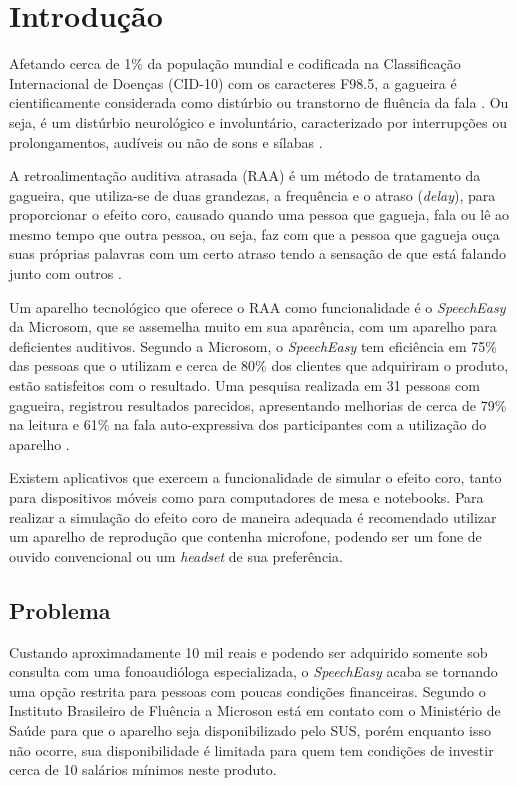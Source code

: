 \chapter{Introdu\c{c}\~ao}

Afetando cerca de 1\% da popula\c{c}\~ao mundial e codificada na Classifica\c{c}\~ao Internacional de Doen\c{c}as (CID-10) com os caracteres F98.5, a gagueira \'e cientificamente considerada como dist\'urbio ou transtorno de flu\^encia da fala \cite{Merlo2013}. Ou seja, \'e um dist\'urbio neurol\'ogico e involunt\'ario, caracterizado por interrup\c{c}\~oes ou prolongamentos, aud\'iveis ou n\~ao de sons e s\'ilabas \cite{Buechel2004}.

A retroalimenta\c{c}\~ao auditiva atrasada (RAA) \'e um m\'etodo de tratamento da gagueira, que utiliza-se de duas grandezas, a frequ\^encia e o atraso (\textit{delay}), para proporcionar o efeito coro, causado quando uma pessoa que gagueja, fala ou l\^e ao mesmo tempo que outra pessoa, ou seja, faz com que  a pessoa que gagueja ou\c{c}a suas pr\'oprias palavras com um certo atraso tendo a sensa\c{c}\~ao de que est\'a falando junto com outros \cite{Udemo2008}.

Um aparelho tecnol\'ogico que oferece o RAA como funcionalidade \'e o \textit{SpeechEasy} da Microsom, que se assemelha muito em sua apar\^encia, com um aparelho para deficientes auditivos. Segundo a Microsom, o \textit{SpeechEasy} tem efici\^encia em 75\% das pessoas que o utilizam e cerca de 80\% dos clientes que adquiriram o produto, est\~ao satisfeitos com o resultado. Uma pesquisa realizada em 31 pessoas com gagueira, registrou resultados parecidos, apresentando melhorias de cerca de 79\% na leitura e 61\% na fala auto-expressiva dos participantes com a utiliza\c{c}\~ao do aparelho \cite{Andrade2008}. 

Existem aplicativos que exercem a funcionalidade de simular o efeito coro, tanto para dispositivos m\'oveis como para computadores de mesa e notebooks. Para realizar a simula\c{c}\~ao do efeito coro de maneira adequada \'e recomendado utilizar um aparelho de reprodu\c{c}\~ao que contenha microfone, podendo ser um fone de ouvido convencional ou um \textit{headset} de sua prefer\^encia.

 
\section{Problema}

Custando aproximadamente 10 mil reais e podendo ser adquirido somente sob consulta com uma fonoaudi\'ologa especializada, o \textit{SpeechEasy} acaba se tornando uma op\c{c}\~ao restrita para pessoas com poucas condi\c{c}\~oes financeiras. Segundo o Instituto Brasileiro de Flu\^encia a Microson est\'a em contato com o Minist\'erio de Sa\'ude para que o aparelho seja disponibilizado pelo SUS, por\'em enquanto isso n\~ao ocorre, sua disponibilidade \'e limitada para quem tem condi\c{c}\~oes de investir cerca de 10 sal\'arios m\'inimos neste produto.

